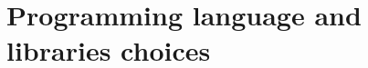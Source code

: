 \chapter{Programming language and libraries choices}
\label{chap:programming_language_libraries_choices}